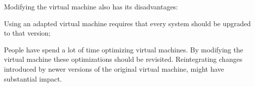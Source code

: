 Modifying the virtual machine also has its disadvantages:
\begin{description}[style=nextline,noitemsep]
  \item[Dependency on adapted virtual machines] Using an adapted virtual machine requires that every system should be upgraded to that version;
  \item[Virtual machine optimization] People have spend a lot of time optimizing virtual machines.
       By modifying the virtual machine these optimizations should be revisited.
       Reintegrating changes introduced by newer versions of the original virtual machine, might have substantial impact.
\end{description}

